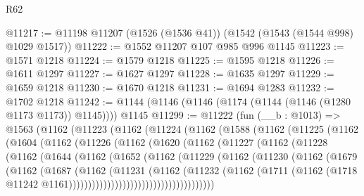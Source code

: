 \begin{lexlean}{R62}
\begin{coremodule}
@11217 := @11198 @11207 (@1526 (@1536 @41)) (@1542 (@1543 (@1544 @998) @1029 @1517))
@11222 := @1552 @11207 @107 @985 @996 @1145
@11223 := @1571 @1218
@11224 := @1579 @1218
@11225 := @1595 @1218
@11226 := @1611 @1297
@11227 := @1627 @1297
@11228 := @1635 @1297
@11229 := @1659 @1218
@11230 := @1670 @1218
@11231 := @1694 @1283
@11232 := @1702 @1218
@11242 := @1144 (@1146 (@1146 (@1174 (@1144 (@1146 (@1280 @1173 @1173)) @1145)))) @1145
@11299 := @11222
    (fun (__b : @1013) =>
    @1563
      (@1162
        (@11223
          (@1162
            (@11224
              (@1162
                (@1588
                  (@1162
                    (@11225
                      (@1162
                        (@1604
                          (@1162
                            (@11226
                              (@1162
                                (@1620
                                  (@1162
                                    (@11227
                                      (@1162
                                        (@11228
                                          (@1162
                                            (@1644
                                              (@1162
                                                (@1652
                                                  (@1162
                                                    (@11229
                                                      (@1162
                                                        (@11230
                                                          (@1162
                                                            (@1679
                                                              (@1162
                                                                (@1687
                                                                  (@1162
                                                                    (@11231
                                                                      (@1162
                                                                        (@11232
                                                                          (@1162
                                                                            (@1711
                                                                              (@1162
                                                                                (@1718
                                                                                  @11242
                                                                                  @1161))))))))))))))))))))))))))))))))))))))

\end{coremodule}
\end{lexlean}
